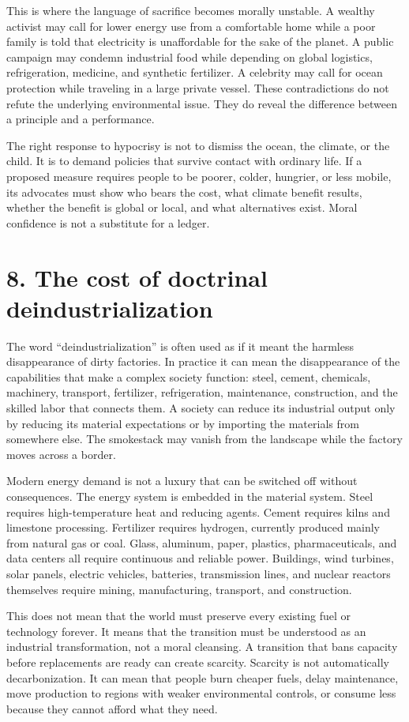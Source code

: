 ﻿\documentclass[12pt,a4paper]{book}
\begin{document}
This is where the language of sacrifice becomes morally unstable. A wealthy activist may call for lower energy use from a comfortable home while a poor family is told that electricity is unaffordable for the sake of the planet. A public campaign may condemn industrial food while depending on global logistics, refrigeration, medicine, and synthetic fertilizer. A celebrity may call for ocean protection while traveling in a large private vessel. These contradictions do not refute the underlying environmental issue. They do reveal the difference between a principle and a performance.

The right response to hypocrisy is not to dismiss the ocean, the climate, or the child. It is to demand policies that survive contact with ordinary life. If a proposed measure requires people to be poorer, colder, hungrier, or less mobile, its advocates must show who bears the cost, what climate benefit results, whether the benefit is global or local, and what alternatives exist. Moral confidence is not a substitute for a ledger.

\section{8. The cost of doctrinal deindustrialization}
The word ``deindustrialization'' is often used as if it meant the harmless disappearance of dirty factories. In practice it can mean the disappearance of the capabilities that make a complex society function: steel, cement, chemicals, machinery, transport, fertilizer, refrigeration, maintenance, construction, and the skilled labor that connects them. A society can reduce its industrial output only by reducing its material expectations or by importing the materials from somewhere else. The smokestack may vanish from the landscape while the factory moves across a border.

Modern energy demand is not a luxury that can be switched off without consequences. The energy system is embedded in the material system. Steel requires high-temperature heat and reducing agents. Cement requires kilns and limestone processing. Fertilizer requires hydrogen, currently produced mainly from natural gas or coal. Glass, aluminum, paper, plastics, pharmaceuticals, and data centers all require continuous and reliable power. Buildings, wind turbines, solar panels, electric vehicles, batteries, transmission lines, and nuclear reactors themselves require mining, manufacturing, transport, and construction.

This does not mean that the world must preserve every existing fuel or technology forever. It means that the transition must be understood as an industrial transformation, not a moral cleansing. A transition that bans capacity before replacements are ready can create scarcity. Scarcity is not automatically decarbonization. It can mean that people burn cheaper fuels, delay maintenance, move production to regions with weaker environmental controls, or consume less because they cannot afford what they need.
\end{document}
